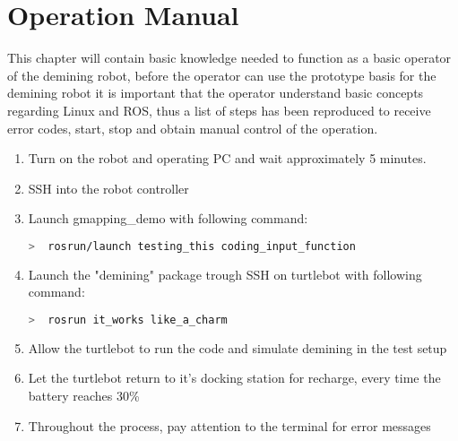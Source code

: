 \chapter{Operation Manual}


This chapter will contain basic knowledge needed to function as a basic operator of the demining robot, before the operator can use the prototype basis for the demining robot it is important that the operator understand basic concepts regarding Linux and ROS, thus a list of steps has been reproduced to receive error codes, start, stop and obtain manual control of the operation.


\begin{enumerate}
    \item Turn on the robot and operating PC and wait approximately 5 minutes.
    \item SSH into the robot controller
    \item Launch gmapping\_demo  with following command:\\
        \begin{lstlisting}[language=bash,numbers=none]
  >  rosrun/launch testing_this coding_input_function
        \end{lstlisting}
    \item Launch the "demining" package trough SSH on turtlebot with following command:\\
        \begin{lstlisting}[language=bash,numbers=none]
  >  rosrun it_works like_a_charm
        \end{lstlisting}
    \item Allow the turtlebot to run the code and simulate demining in the test setup
    \item Let the turtlebot return to it's docking station for recharge, every time the battery reaches 30\%
    \item Throughout the process, pay attention to the terminal for error messages
\end{enumerate}